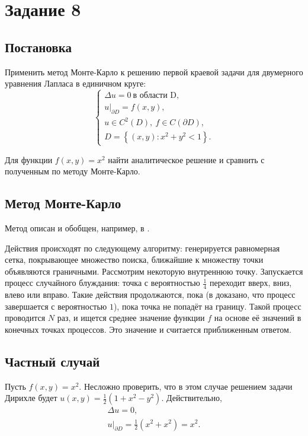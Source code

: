 \documentclass[12pt, a4paper]{article}
\begin{document}
\newpage

\section{Задание 8}
\subsection{Постановка}
Применить метод Монте-Карло к решению первой краевой задачи для двумерного уравнения Лапласа в единичном круге:
\[\begin{cases}
\Delta u = 0\ \text {в области D}, \\
\left. u \right|_{\partial D} = f(x,y), \\
u\in C^2(D),\ f\in C(\partial D), \\
D = \left\{ \left( x,y \right)\colon x^2+y^2<1 \right\}.
\end{cases}\]

Для функции $f(x,y)=x^2$ найти аналитическое решение и сравнить с полученным по методу Монте-Карло. 

\subsection{Метод Монте-Карло}
Метод описан и обобщен, например, в \cite{Buslenko_Shreider}.

Действия происходят по следующему алгоритму: генерируется равномерная сетка, покрывающее множество поиска, ближайшие к множеству точки объявляются граничными. Рассмотрим некоторую внутреннюю точку. Запускается процесс случайного блуждания: точка с вероятностью $\frac{1}{4}$ переходит вверх, вниз, влево или вправо. Такие действия продолжаются, пока (в \cite{shiryaev} доказано, что процесс завершается с вероятностью $1$), пока точка не попадёт на границу. Такой процесс проводится $N$ раз, и ищется среднее значение функции $f$ на основе её значений в конечных точках процессов. Это значение и считается приближенным ответом.


\subsection{Частный случай}
Пусть $f(x,y) = x^2$. Несложно проверить, что в этом случае решением задачи Дирихле будет $u(x,y)=\frac{1}{2}\left( 1+x^2-y^2 \right)$. Действительно, 
\begin{gather*}
\Delta u = 0, \\
\left. u\right| _{\partial D} = \frac 12 \left( x^2 + x^2\right) = x^2.
\end{gather*} 
\end{document}
